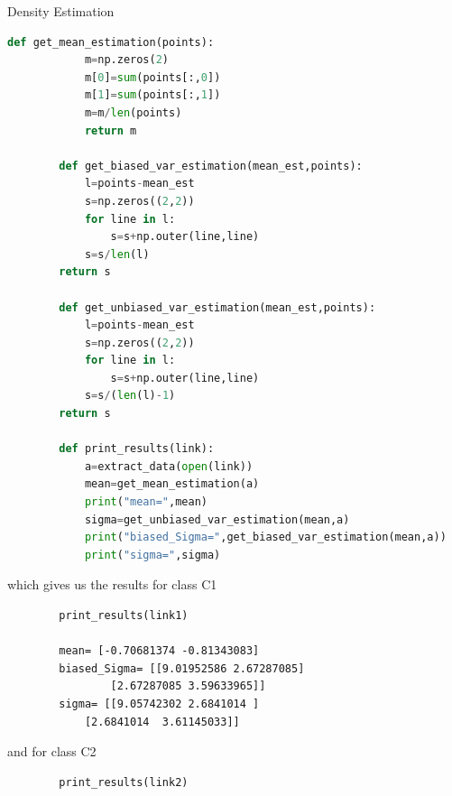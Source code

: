 \documentclass[
ngerman,
]{tudaexercise}
\begin{document}
\begin{task}{Density Estimation}
\begin{subtask}
\begin{lstlisting}[language=Python]
		def get_mean_estimation(points):
			m=np.zeros(2)
			m[0]=sum(points[:,0])
			m[1]=sum(points[:,1])
			m=m/len(points)
			return m
		
		def get_biased_var_estimation(mean_est,points):
			l=points-mean_est
			s=np.zeros((2,2))
			for line in l:
				s=s+np.outer(line,line)
			s=s/len(l)
		return s
		
		def get_unbiased_var_estimation(mean_est,points):
			l=points-mean_est
			s=np.zeros((2,2))
			for line in l:
				s=s+np.outer(line,line)
			s=s/(len(l)-1)
		return s
		
		def print_results(link):
			a=extract_data(open(link))
			mean=get_mean_estimation(a)
			print("mean=",mean)
			sigma=get_unbiased_var_estimation(mean,a)
			print("biased_Sigma=",get_biased_var_estimation(mean,a))
			print("sigma=",sigma)
		\end{lstlisting}
		which gives us the results for class C1
		\begin{lstlisting}
		print_results(link1)
		
		mean= [-0.70681374 -0.81343083]
		biased_Sigma= [[9.01952586 2.67287085]
				[2.67287085 3.59633965]]
		sigma= [[9.05742302 2.6841014 ]
			[2.6841014  3.61145033]]
		\end{lstlisting}
		and for class C2
		\begin{lstlisting}
		print_results(link2)
		

\end{lstlisting}
\end{subtask}
\end{task}
\end{document}
